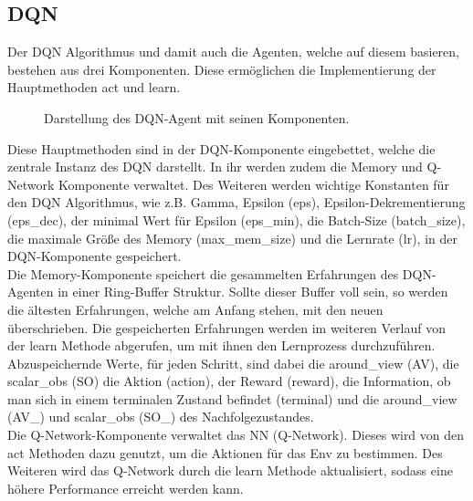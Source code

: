 \subsection{DQN} \label{sec:Konzept_DQN}
Der DQN Algorithmus und damit auch die Agenten, welche auf diesem basieren, bestehen aus drei Komponenten. Diese ermöglichen die Implementierung der Hauptmethoden act und learn.
\begin{figure}[H]
	\centering
	\def\svgscale{0.18}
	
	\caption[DQN-Agent]{Darstellung des DQN-Agent mit seinen Komponenten.}
	\label{fig:DQN-Agent}
\end{figure}
Diese Hauptmethoden sind in der DQN-Komponente eingebettet, welche die zentrale Instanz des DQN darstellt. In ihr werden zudem die Memory und Q-Network Komponente verwaltet. Des Weiteren werden wichtige Konstanten für den DQN Algorithmus, wie z.B. Gamma, Epsilon (eps), Epsilon-Dekrementierung (eps\_dec), der minimal Wert für Epsilon (eps\_min), die Batch-Size (batch\_size), die maximale Größe des Memory (max\_mem\_size) und die Lernrate (lr), in der DQN-Komponente gespeichert.\\
Die Memory-Komponente speichert die gesammelten Erfahrungen des DQN-Agenten in einer Ring-Buffer Struktur. Sollte dieser Buffer voll sein, so werden die ältesten Erfahrungen, welche am Anfang stehen, mit den neuen überschrieben.
Die gespeicherten Erfahrungen werden im weiteren Verlauf von der learn Methode abgerufen, um mit ihnen den Lernprozess durchzuführen. 
Abzuspeichernde Werte, für jeden Schritt, sind dabei die around\_view (AV), die scalar\_obs (SO) die Aktion (action), der Reward (reward), die Information, ob man sich in einem terminalen Zustand befindet (terminal) und die around\_view (AV\_) und scalar\_obs (SO\_) des Nachfolgezustandes.\\
Die Q-Network-Komponente verwaltet das NN (Q-Network). Dieses wird von den act Methoden dazu genutzt, um die Aktionen für das Env zu bestimmen. Des Weiteren wird das Q-Network durch die learn Methode aktualisiert, sodass eine höhere Performance erreicht werden kann.

